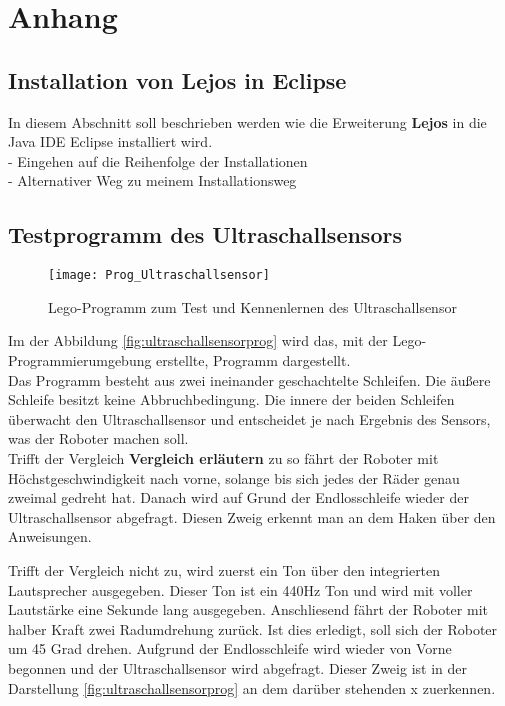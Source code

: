 \chapter{Anhang}
\section{Installation von Lejos in Eclipse}
In diesem Abschnitt soll beschrieben werden wie die Erweiterung \textbf{Lejos} in die Java IDE Eclipse installiert wird.\\ 
- Eingehen auf die Reihenfolge der Installationen\\
- Alternativer Weg zu meinem Installationsweg \\
\section{Testprogramm des Ultraschallsensors}
\begin{figure}[htb]
\centering
\texttt{[image: Prog\_Ultraschallsensor]}
\caption{Lego-Programm zum Test und Kennenlernen des Ultraschallsensor}
\label{fig:ultraschallsensorprog}
\end{figure}
Im der Abbildung \vref{fig:ultraschallsensorprog} wird das, mit der Lego-Programmierumgebung erstellte, Programm dargestellt.\\
Das Programm besteht aus zwei ineinander geschachtelte Schleifen. Die äußere Schleife besitzt keine Abbruchbedingung. Die innere der beiden Schleifen überwacht den Ultraschallsensor und entscheidet je nach Ergebnis des Sensors, was der Roboter machen soll.\\
Trifft der Vergleich \textbf{Vergleich erläutern} zu so fährt der Roboter mit Höchstgeschwindigkeit nach vorne, solange bis sich jedes der Räder genau zweimal gedreht hat. Danach wird auf Grund der Endlosschleife wieder der Ultraschallsensor abgefragt. Diesen Zweig erkennt man an dem Haken über den Anweisungen.

Trifft der Vergleich nicht zu, wird zuerst ein Ton über den integrierten Lautsprecher ausgegeben. Dieser Ton ist ein 440Hz Ton und wird mit voller Lautstärke eine Sekunde lang ausgegeben. Anschliesend fährt der Roboter mit halber Kraft zwei Radumdrehung zurück. Ist dies erledigt, soll sich der Roboter um 45 Grad drehen. Aufgrund der Endlosschleife wird wieder von Vorne begonnen und der Ultraschallsensor wird abgefragt. Dieser Zweig ist in der Darstellung \vref{fig:ultraschallsensorprog} an dem darüber stehenden x zuerkennen.

